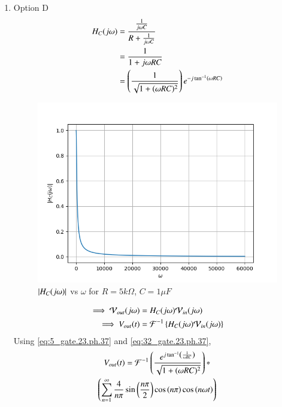 \documentclass[journal,12pt,twocolumn]{IEEEtran}
\theoremstyle{remark}
\begin{document}
\begin{enumerate}
    \item Option D
    \begin{align}
        H_C(j\omega) &=  \frac{\frac{1}{j\omega C}}{R + \frac{1}{j\omega C}}\\
        &= \frac{1}{1+j\omega RC}\\
        &= \left(\frac{1}{\sqrt{1 + (\omega R C)^2}}\right)e^{-j\tan^{-1}\left(\omega RC\right)}\label{eq:32_gate.23.ph.37}
    \end{align}
    \begin{figure}[!h]
        \centering
        \includegraphics[width=\columnwidth]{figs/opt_d_hf.png}
        \caption{$\left\vert H_C(j\omega)\right\vert$ vs $\omega$ for $R=5k\Omega$, $C=1\mu F$}
        \label{fig:opt_d_hf_gate.ph.23.37}
    \end{figure}
    \newpage
    \begin{align}
        \implies \mathcal{V}_{out}(j\omega) &= H_C(j\omega)\mathcal{V}_{in}(j\omega)\\
        \implies V_{out}(t) &= \mathcal{F}^{-1}\left\{H_C(j\omega)\mathcal{V}_{in}(j\omega)\right\}
    \end{align}
    Using \eqref{eq:5_gate.23.ph.37} and \eqref{eq:32_gate.23.ph.37}, 
    \begin{multline}
    V_{out}(t)=\mathcal{F}^{-1}\left(\frac{e^{j\tan^{-1}\left(\frac{1}{\omega RC}\right)}}{\sqrt{1 + (\omega R C)^2}}\right)\ast\\ \left(\sum_{n = 1}^{\infty}\frac{4}{n\pi}\sin{\ensuremath{\left(\frac{n\pi}{2}\right)}}\cos\left({n\pi}\right) \cos{\ensuremath{\left(n\omega t\right)}}\right)
    \end{multline}
    \begin{figure}[!h]

\end{figure}
\end{enumerate}
\end{document}
